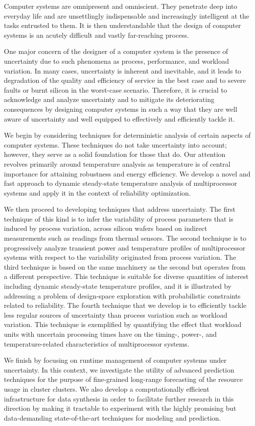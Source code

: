 Computer systems are omnipresent and omniscient. They penetrate deep into
everyday life and are unsettlingly indispensable and increasingly intelligent at
the tasks entrusted to them. It is then understandable that the design of
computer systems is an acutely difficult and vastly far-reaching process.

One major concern of the designer of a computer system is the presence of
uncertainty due to such phenomena as process, performance, and workload
variation. In many cases, uncertainty is inherent and inevitable, and it leads
to degradation of the quality and efficiency of service in the best case and to
severe faults or burnt silicon in the worst-case scenario. Therefore, it is
crucial to acknowledge and analyze uncertainty and to mitigate its deteriorating
consequences by designing computer systems in such a way that they are well
aware of uncertainty and well equipped to effectively and efficiently tackle it.

We begin by considering techniques for deterministic analysis of certain aspects
of computer systems. These techniques do not take uncertainty into account;
however, they serve as a solid foundation for those that do. Our attention
revolves primarily around temperature analysis as temperature is of central
importance for attaining robustness and energy efficiency. We develop a novel
and fast approach to dynamic steady-state temperature analysis of multiprocessor
systems and apply it in the context of reliability optimization.

We then proceed to developing techniques that address uncertainty. The first
technique of this kind is to infer the variability of process parameters that is
induced by process variation, across silicon wafers based on indirect
measurements such as readings from thermal sensors. The second technique is to
progressively analyze transient power and temperature profiles of multiprocessor
systems with respect to the variability originated from process variation. The
third technique is based on the same machinery as the second but operates from a
different perspective. This technique is suitable for diverse quantities of
interest including dynamic steady-state temperature profiles, and it is
illustrated by addressing a problem of design-space exploration with
probabilistic constraints related to reliability. The fourth technique that we
develop is to efficiently tackle less regular sources of uncertainty than
process variation such as workload variation. This technique is exemplified by
quantifying the effect that workload units with uncertain processing times have
on the timing-, power-, and temperature-related characteristics of
multiprocessor systems.

We finish by focusing on runtime management of computer systems under
uncertainty. In this context, we investigate the utility of advanced prediction
techniques for the purpose of fine-grained long-range forecasting of the
resource usage in cluster clusters. We also develop a computationally efficient
infrastructure for data synthesis in order to facilitate further research in
this direction by making it tractable to experiment with the highly promising
but data-demanding state-of-the-art techniques for modeling and prediction.
